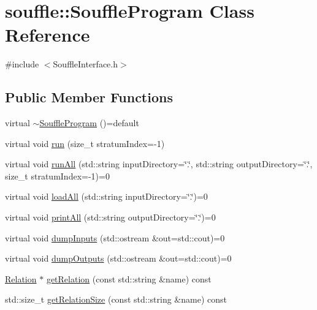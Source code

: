 \hypertarget{classsouffle_1_1_souffle_program}{}\section{souffle\+:\+:Souffle\+Program Class Reference}
\label{classsouffle_1_1_souffle_program}


{\ttfamily \#include $<$Souffle\+Interface.\+h$>$}

\subsection*{Public Member Functions}
\begin{DoxyCompactItemize}
\item 
virtual \hyperlink{classsouffle_1_1_souffle_program_ae2f4223a3f80c0239e404ef8da23d669}{$\sim$\+Souffle\+Program} ()=default
\item 
virtual void \hyperlink{classsouffle_1_1_souffle_program_a75c26ced8fb9dd2d6f988a1f9110f838}{run} (size\+\_\+t stratum\+Index=-\/1)
\item 
virtual void \hyperlink{classsouffle_1_1_souffle_program_abad6822dd2e9ff1a74803821bb39a313}{run\+All} (std\+::string input\+Directory=\char`\"{}.\char`\"{}, std\+::string output\+Directory=\char`\"{}.\char`\"{}, size\+\_\+t stratum\+Index=-\/1)=0
\item 
virtual void \hyperlink{classsouffle_1_1_souffle_program_a82608bf8018e98e96d06d285333c8620}{load\+All} (std\+::string input\+Directory=\char`\"{}.\char`\"{})=0
\item 
virtual void \hyperlink{classsouffle_1_1_souffle_program_aae47a2083a0d67eb44c9914cb22ab182}{print\+All} (std\+::string output\+Directory=\char`\"{}.\char`\"{})=0
\item 
virtual void \hyperlink{classsouffle_1_1_souffle_program_af431ea120ea40662a9c037b9e0f1e1ea}{dump\+Inputs} (std\+::ostream \&out=std\+::cout)=0
\item 
virtual void \hyperlink{classsouffle_1_1_souffle_program_a47526ebe874cdb90421e60d86e8b0c53}{dump\+Outputs} (std\+::ostream \&out=std\+::cout)=0
\item 
\hyperlink{classsouffle_1_1_relation}{Relation} $\ast$ \hyperlink{classsouffle_1_1_souffle_program_a8a5b114c5b6c8022c936a533248996e7}{get\+Relation} (const std\+::string \&name) const
\item 
std\+::size\+\_\+t \hyperlink{classsouffle_1_1_souffle_program_a729cb758eeef2b2443791d8cd97a5ef2}{get\+Relation\+Size} (const std\+::string \&name) const

\end{DoxyCompactItemize}
